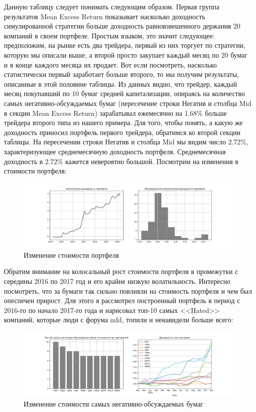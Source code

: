 \documentclass{article}
\begin{document}
Данную таблицу следует понимать следующим образом. Первая группа результатов Mean Excess Return показывает насколько доходность симулированной стратегии больше доходность равновзвешенного держания 20 компаний в своем портфеле. Простым языком, это значит следующее: предположим, на рынке есть два трейдера, первый из них торгует по стратегии, которую мы описали выше, а второй просто закупает каждый месяц по 20 бумаг и в конце каждого месяца их продает. Вот если посмотреть, насколько статистически первый заработает больше второго, то мы получим результаты, описанные в этой половине таблицы. Из данных видно, что трейдер, каждый месяц покупавший по 10 бумаг средней капитализации, опираясь на количество самых негативно-обсуждаемых бумаг (пересечение строки Негатив и столбца Mid в секции Mean Excess Return) зарабатывал ежемесячно на 1.68\%  больше трейдера второго типа из нашего примера. Для того, чтобы понять, а какую же доходность приносил портфель первого трейдера, обратимся ко второй секции таблицы. На пересечении строки Негатив и столбца Mid мы видим число 2.72\%, характеризующее среднемесячную доходность портфеля. Среднемесячная доходность в 2.72\% кажется невероятно большой. Посмотрим на изменения в стоимости портфеля:

\begin{figure}[h]
	\includegraphics[scale=0.4]{portfel.png}
	\caption{Изменение стоимости портфеля}
\end{figure}

Обратим внимание на колосальный рост стоимости портфеля в промежутки с середины 2016 по 2017 год и его крайне низкую волатильность. Интересно посмотреть, что за бумаги так сильно повлияли на стоимость портфеля и чем был опеспечен прирост. Для этого я рассмотрел построенный портфель в период с 2016-го по начало 2017-го года и нарисовал топ-10 самых <<Hated>> компаний, которые люди с форума mfd, топили и ненавидели больше всего: 

\begin{figure}[h]
	\includegraphics[scale=0.4]{rofl.png}
	\caption{Изменение стоимости самых негативно-обсуждаемых бумаг}
	\label{fig:rofl}
\end{figure}
\end{document}
